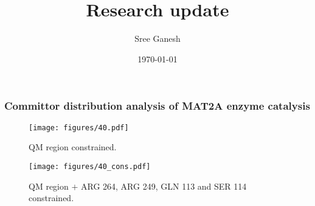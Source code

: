 \documentclass[a4paper,8pt]{beamer}
\title[Free energy]{Research update}
\date{\today}
\author{Sree Ganesh}
\institute[U of A]{Schwartz Group \\ University of Arizona}
\begin{document}
\maketitle
%
%
%
%
\begin{frame}
\frametitle{Committor distribution analysis of MAT2A enzyme catalysis}
    \begin{figure}[ht]
        \begin{minipage}[b]{0.45\linewidth}
            \centering
            \texttt{[image: figures/40.pdf]}
            \caption{QM region constrained.}
            \label{fig:a}
        \end{minipage}
        \hspace{0.5cm}
        \begin{minipage}[b]{0.45\linewidth}
            \centering
            \texttt{[image: figures/40\_cons.pdf]}
            \caption{QM region $+$ ARG 264, ARG 249, GLN 113 and SER 114 constrained.}
            \label{fig:b}
        \end{minipage}
    \end{figure}
\end{frame}
%
\end{document}
